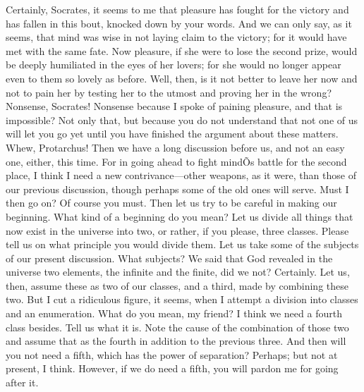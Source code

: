 \documentclass[letterpaper,12pt]{article}
\newcommand{\stephpag}[1]{\marginnote{\small\itshape\fontfamily{ppl}\selectfont #1}}
\begin{document}
\begin{drama}
\protarchusspeaks
Certainly, Socrates, it seems to me that pleasure has fought for the victory and has fallen in this bout, knocked down by your words. \stephpag{23 a} And we can only say, as it seems, that mind was wise in not laying claim to the victory; for it would have met with the same fate. Now pleasure, if she were to lose the second prize, would be deeply humiliated in the eyes of her lovers; for she would no longer appear even to them so lovely as before.
\socratesspeaks
Well, then, is it not better to leave her now and not to pain her by testing her to the utmost and proving her in the wrong?
\protarchusspeaks
Nonsense, Socrates! \stephpag{b}
\socratesspeaks
Nonsense because I spoke of paining pleasure, and that is impossible?
\protarchusspeaks
Not only that, but because you do not understand that not one of us will let you go yet until you have finished the argument about these matters.
\socratesspeaks
Whew, Protarchus! Then we have a long discussion before us, and not an easy one, either, this time. For in going ahead to fight mindÕs battle for the second place, I think I need a new contrivance---other weapons, as it were, than those of our previous discussion, though perhaps some of the old ones will serve. Must I then go on?
\protarchusspeaks
Of course you must.
\socratesspeaks
Then let us try to be careful \stephpag{c} in making our beginning.
\protarchusspeaks
What kind of a beginning do you mean?
\socratesspeaks
Let us divide all things that now exist in the universe into two, or rather, if you please, three classes.
\protarchusspeaks
Please tell us on what principle you would divide them.
\socratesspeaks
Let us take some of the subjects of our present discussion.
\protarchusspeaks
What subjects?
\socratesspeaks
We said that God revealed in the universe two elements, the infinite and the finite, did we not?
\protarchusspeaks
Certainly.
\socratesspeaks
Let us, then, assume these as two of our classes, and a third, made by combining these two. \stephpag{d} But I cut a ridiculous figure, it seems, when I attempt a division into classes and an enumeration.
\protarchusspeaks
What do you mean, my friend?
\socratesspeaks
I think we need a fourth class besides.
\protarchusspeaks
Tell us what it is.
\socratesspeaks
Note the cause of the combination of those two and assume that as the fourth in addition to the previous three.
\protarchusspeaks
And then will you not need a fifth, which has the power of separation?
\socratesspeaks
Perhaps; but not at present, I think. However, if we do need a fifth, \stephpag{e} you will pardon me for going after it.

\end{drama}
\end{document}

